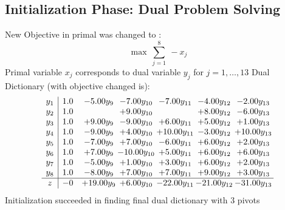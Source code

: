 \documentclass[9pt]{article}
\begin{document}
\subsection{Initialization Phase: Dual Problem Solving}
New Objective in primal was changed to : \[ \max\ \sum_{j=1}^{8}\ - x_j \] 
Primal variable $x_j$ corresponds to dual variable $y_j$ for $j = 1,\ldots,13$
Dual Dictionary (with objective changed is): 
\[\begin{array}{c| c c@{\hskip 2pt} c@{\hskip 2pt} c@{\hskip 2pt} c@{\hskip 2pt} c@{\hskip 2pt} }
 y_{1}   &  1.0 & -5.00 y_{9} & -7.00 y_{10} & -7.00 y_{11} & -4.00 y_{12} & -2.00 y_{13}\\
 y_{2}   &  1.0  &   & +  9.00 y_{10} &   & +  8.00 y_{12} & -6.00 y_{13}\\
 y_{3}   &  1.0 & +  9.00 y_{9} & -9.00 y_{10} & +  6.00 y_{11} & +  5.00 y_{12} & +  1.00 y_{13}\\
 y_{4}   &  1.0 & -9.00 y_{9} & +  4.00 y_{10} & + 10.00 y_{11} & -3.00 y_{12} & + 10.00 y_{13}\\
 y_{5}   &  1.0 & -7.00 y_{9} & +  7.00 y_{10} & -6.00 y_{11} & +  6.00 y_{12} & +  2.00 y_{13}\\
 y_{6}   &  1.0 & +  7.00 y_{9} & -10.00 y_{10} & +  5.00 y_{11} & +  6.00 y_{12} & +  6.00 y_{13}\\
 y_{7}   &  1.0 & -5.00 y_{9} & +  1.00 y_{10} & +  3.00 y_{11} & +  6.00 y_{12} & +  2.00 y_{13}\\
 y_{8}   &  1.0 & -8.00 y_{9} & +  7.00 y_{10} & +  7.00 y_{11} & +  9.00 y_{12} & +  3.00 y_{13}\\
\hline
z    &  -0 & + 19.00 y_{9} & +  6.00 y_{10} & -22.00 y_{11} & -21.00 y_{12} & -31.00 y_{13}\\
\end{array}\]
Initialization succeeded in finding final dual dictionary with 3 pivots
\end{document}
